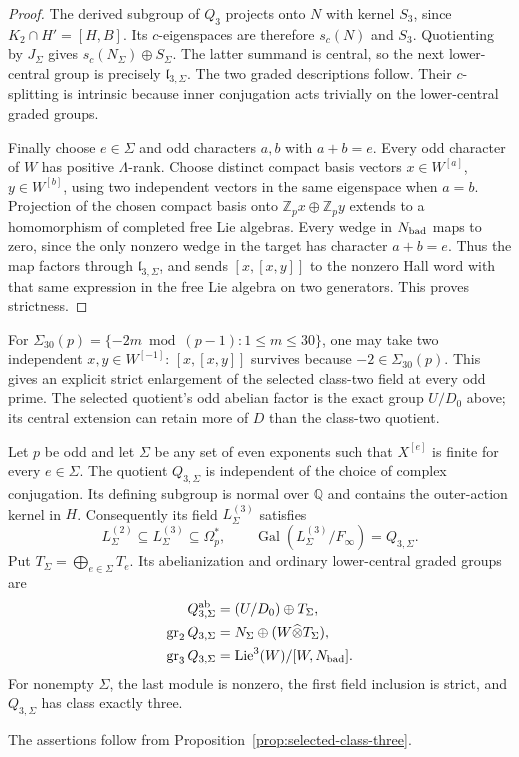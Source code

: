 \begin{proof}
The derived subgroup of $Q_3$ projects onto $N$ with kernel
$S_3$, since $K_2\cap H'=[H,B]$.  Its $c$-eigenspaces are
therefore $s_c(N)$ and $S_3$.  Quotienting by $J_\Sigma$ gives
$s_c(N_\Sigma)\oplus S_\Sigma$.  The latter summand is central,
so the next lower-central group is precisely $\mathfrak l_{3,\Sigma}$.
The two graded descriptions follow.  Their $c$-splitting is
intrinsic because inner conjugation acts trivially on the
lower-central graded groups.

Finally choose $e\in\Sigma$ and odd characters $a,b$ with
$a+b=e$.  Every odd character of $W$ has positive
$\Lambda$-rank.  Choose distinct compact basis vectors
$x\in W^{[a]}$, $y\in W^{[b]}$, using two independent vectors
in the same eigenspace when $a=b$.  Projection of the chosen compact basis onto $\mathbb Z_p x\oplus\mathbb Z_p y$
extends to a homomorphism of completed free Lie algebras.
Every wedge in $N_{\rm bad}$ maps to zero, since the only
nonzero wedge in the target has character $a+b=e$.
Thus the map factors through $\mathfrak l_{3,\Sigma}$, and sends
$[x,[x,y]]$ to the nonzero Hall word with that same expression
in the free Lie algebra on two generators. This proves strictness.
\end{proof}

For $\Sigma_{30}(p)=\{-2m\bmod(p-1):1\le m\le30\}$,
one may take two independent $x,y\in W^{[-1]}$:
$[x,[x,y]]$ survives because $-2\in\Sigma_{30}(p)$.
This gives an explicit strict enlargement of the selected
class-two field at every odd prime.  The selected quotient's
odd abelian factor is the exact group $U/D_0$ above; its
central extension can retain more of $D$ than the class-two
quotient.

\begin{corollary}
\label{thm:class-three-components}
Let $p$ be odd and let $\Sigma$ be any set of even exponents
such that $X^{[e]}$ is finite for every $e\in\Sigma$.
The quotient $Q_{3,\Sigma}$ is independent of the choice of
complex conjugation. Its defining subgroup is normal over
$\mathbb Q$ and contains the outer-action kernel in $H$.
Consequently its field $L_\Sigma^{(3)}$ satisfies
\[
 L_\Sigma^{(2)}\subseteq L_\Sigma^{(3)}\subseteq\Omega_p^*,
 \qquad \operatorname{Gal}(L_\Sigma^{(3)}/F_\infty)=Q_{3,\Sigma}.
\]
Put $T_\Sigma=\bigoplus_{e\in\Sigma}T_e$.
Its abelianization and ordinary lower-central graded groups are
\begin{align*}
 Q_{3,\Sigma}^{\rm ab}&=(U/D_0)\oplus T_\Sigma,\\
 \operatorname{gr}_2Q_{3,\Sigma}&=N_\Sigma\oplus(W\widehat\otimes T_\Sigma),\\
 \operatorname{gr}_3Q_{3,\Sigma}&=
       \operatorname{Lie}^3(W)/[W,N_{\rm bad}].
\end{align*}
For nonempty $\Sigma$, the last module is nonzero, the first
field inclusion is strict, and $Q_{3,\Sigma}$ has class exactly three.
\end{corollary}
The assertions follow from Proposition~\ref{prop:selected-class-three}.
